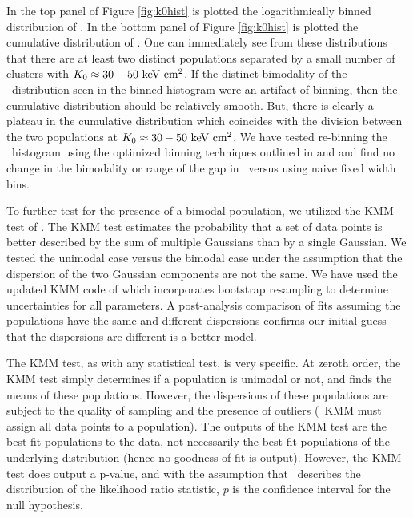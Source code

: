 \documentclass[12pt,preprint]{aastex}
\begin{document}
In the top panel of Figure \ref{fig:k0hist} is plotted the
logarithmically binned distribution of \kna. In the bottom panel of
Figure \ref{fig:k0hist} is plotted the cumulative distribution of
\kna. One can immediately see from these distributions that there are
at least two distinct populations separated by a small number of
clusters with $K_0 \approx 30-50 \mathrm{\mbox{\ensuremath{\mathrm{~keV}}} \mathrm{\mbox{\ensuremath{\mathrm{~cm}}}^2}}$. If the distinct bimodality of
the \kna\ distribution seen in the binned histogram were an artifact
of binning, then the cumulative distribution should be relatively
smooth. But, there is clearly a plateau in the cumulative distribution
which coincides with the division between the two populations at $K_0
\approx 30-50 \mathrm{\mbox{\ensuremath{\mathrm{~keV}}} \mathrm{\mbox{\ensuremath{\mathrm{~cm}}}^2}}$. We have tested re-binning the \kna\ histogram
using the optimized binning techniques outlined in \citet{knuthbin}
and \citet{2008arXiv0807.4820H} and find no change in the bimodality
or range of the gap in \kna\ versus using naive fixed width bins.

To further test for the presence of a bimodal population, we utilized
the KMM test of \citet{kmm1}. The KMM test estimates the probability
that a set of data points is better described by the sum of multiple
Gaussians than by a single Gaussian. We tested the unimodal case
versus the bimodal case under the assumption that the dispersion of
the two Gaussian components are not the same. We have used the updated
KMM code of \citet{kmm2} which incorporates bootstrap resampling to
determine uncertainties for all parameters. A post-analysis comparison
of fits assuming the populations have the same and different
dispersions confirms our initial guess that the dispersions are
different is a better model.

The KMM test, as with any statistical test, is very specific. At
zeroth order, the KMM test simply determines if a population is
unimodal or not, and finds the means of these populations. However,
the dispersions of these populations are subject to the quality of
sampling and the presence of outliers (\eg\ KMM must assign all data
points to a population). The outputs of the KMM test are the best-fit
populations to the data, not necessarily the best-fit populations of
the underlying distribution (hence no goodness of fit is
output). However, the KMM test does output a p-value, and with the
assumption that \chisq\ describes the distribution of the likelihood
ratio statistic, $p$ is the confidence interval for the null
hypothesis.
\end{document}
